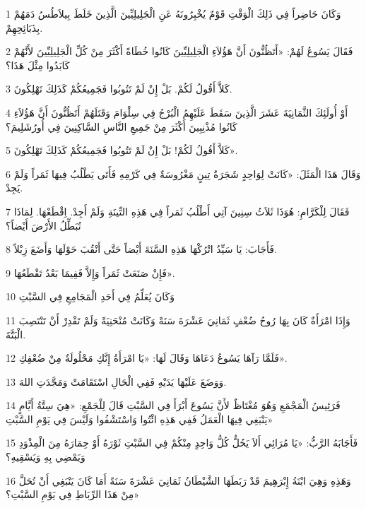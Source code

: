 \par 1 وَكَانَ حَاضِراً فِي ذَلِكَ الْوَقْتِ قَوْمٌ يُخْبِرُونَهُ عَنِ الْجَلِيلِيِّينَ الَّذِينَ خَلَطَ بِيلاَطُسُ دَمَهُمْ بِذَبَائِحِهِمْ.
\par 2 فَقَالَ يَسُوعُ لَهُمْ: «أَتَظُنُّونَ أَنَّ هَؤُلاَءِ الْجَلِيلِيِّينَ كَانُوا خُطَاةً أَكْثَرَ مِنْ كُلِّ الْجَلِيلِيِّينَ لأَنَّهُمْ كَابَدُوا مِثْلَ هَذَا؟
\par 3 كَلاَّ أَقُولُ لَكُمْ. بَلْ إِنْ لَمْ تَتُوبُوا فَجَمِيعُكُمْ كَذَلِكَ تَهْلِكُونَ.
\par 4 أَوْ أُولَئِكَ الثَّمَانِيَةَ عَشَرَ الَّذِينَ سَقَطَ عَلَيْهِمُ الْبُرْجُ فِي سِلْوَامَ وَقَتَلَهُمْ أَتَظُنُّونَ أَنَّ هَؤُلاَءِ كَانُوا مُذْنِبِينَ أَكْثَرَ مِنْ جَمِيعِ النَّاسِ السَّاكِنِينَ فِي أُورُشَلِيمَ؟
\par 5 كَلاَّ أَقُولُ لَكُمْ! بَلْ إِنْ لَمْ تَتُوبُوا فَجَمِيعُكُمْ كَذَلِكَ تَهْلِكُونَ».
\par 6 وَقَالَ هَذَا الْمَثَلَ: «كَانَتْ لِوَاحِدٍ شَجَرَةُ تِينٍ مَغْرُوسَةٌ فِي كَرْمِهِ فَأَتَى يَطْلُبُ فِيهَا ثَمَراً وَلَمْ يَجِدْ.
\par 7 فَقَالَ لِلْكَرَّامِ: هُوَذَا ثَلاَثُ سِنِينَ آتِي أَطْلُبُ ثَمَراً فِي هَذِهِ التِّينَةِ وَلَمْ أَجِدْ. اِقْطَعْهَا. لِمَاذَا تُبَطِّلُ الأَرْضَ أَيْضاً؟
\par 8 فَأَجَابَ: يَا سَيِّدُ اتْرُكْهَا هَذِهِ السَّنَةَ أَيْضاً حَتَّى أَنْقُبَ حَوْلَهَا وَأَضَعَ زِبْلاً.
\par 9 فَإِنْ صَنَعَتْ ثَمَراً وَإِلاَّ فَفِيمَا بَعْدُ تَقْطَعُهَا».
\par 10 وَكَانَ يُعَلِّمُ فِي أَحَدِ الْمَجَامِعِ فِي السَّبْتِ
\par 11 وَإِذَا امْرَأَةٌ كَانَ بِهَا رُوحُ ضُعْفٍ ثَمَانِيَ عَشْرَةَ سَنَةً وَكَانَتْ مُنْحَنِيَةً وَلَمْ تَقْدِرْ أَنْ تَنْتَصِبَ الْبَتَّةَ.
\par 12 فَلَمَّا رَآهَا يَسُوعُ دَعَاهَا وَقَالَ لَهَا: «يَا امْرَأَةُ إِنَّكِ مَحْلُولَةٌ مِنْ ضُعْفِكِ».
\par 13 وَوَضَعَ عَلَيْهَا يَدَيْهِ فَفِي الْحَالِ اسْتَقَامَتْ وَمَجَّدَتِ اللهَ.
\par 14 فَرَئِيسُ الْمَجْمَعِ وَهُوَ مُغْتَاظٌ لأَنَّ يَسُوعَ أَبْرَأَ فِي السَّبْتِ قَالَ لِلْجَمْعِ: «هِيَ سِتَّةُ أَيَّامٍ يَنْبَغِي فِيهَا الْعَمَلُ فَفِي هَذِهِ ائْتُوا وَاسْتَشْفُوا وَلَيْسَ فِي يَوْمِ السَّبْتِ»
\par 15 فَأَجَابَهُ الرَّبُّ: «يَا مُرَائِي أَلاَ يَحُلُّ كُلُّ وَاحِدٍ مِنْكُمْ فِي السَّبْتِ ثَوْرَهُ أَوْ حِمَارَهُ مِنَ الْمِذْوَدِ وَيَمْضِي بِهِ وَيَسْقِيهِ؟
\par 16 وَهَذِهِ وَهِيَ ابْنَةُ إِبْرَهِيمَ قَدْ رَبَطَهَا الشَّيْطَانُ ثَمَانِيَ عَشْرَةَ سَنَةً أَمَا كَانَ يَنْبَغِي أَنْ تُحَلَّ مِنْ هَذَا الرِّبَاطِ فِي يَوْمِ السَّبْتِ؟»
